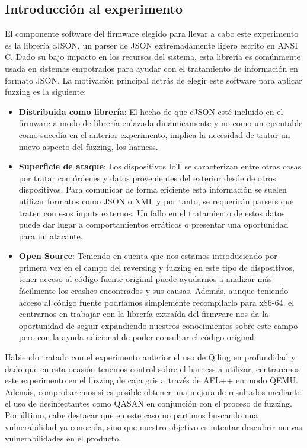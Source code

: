\subsection{Introducción al experimento}
El componente software del firmware elegido para llevar a cabo este experimento es la librería cJSON\cite{cJSON}, un parser de JSON extremadamente 
ligero escrito en ANSI C. Dado su bajo impacto en los recursos del sistema, esta librería es comúnmente usada en sistemas empotrados para
ayudar con el tratamiento de información en formato JSON. La motivación principal detrás de elegir este software para aplicar fuzzing es
la siguiente:
\begin{itemize}
    \item \textbf{Distribuida como librería}: El hecho de que cJSON esté incluido en el firmware a modo de librería enlazada dinámicamente y no como un ejecutable
    como sucedía en el anterior experimento, implica la necesidad de tratar un nuevo aspecto del fuzzing, los harness.
    \item \textbf{Superficie de ataque}: Los dispositivos IoT se caracterizan entre otras cosas por tratar con órdenes y datos provenientes del exterior
    desde de otros dispositivos. Para comunicar de forma eficiente esta información se suelen utilizar formatos como JSON o XML y por tanto, se 
    requerirán parsers que traten con esos inputs externos. Un fallo en el tratamiento de estos datos puede dar lugar a comportamientos erráticos o 
    presentar una oportunidad para un atacante.
    \item \textbf{Open Source}: Teniendo en cuenta que nos estamos introduciendo por primera vez en el campo del reversing y fuzzing en este tipo de 
    dispositivos, tener acceso al código fuente original puede ayudarnos a analizar más fácilmente los crashes encontrados y sus causas. Además, 
    aunque teniendo acceso al código fuente podríamos simplemente recompilarlo para x86-64, el centrarnos en trabajar con la librería extraída del firmware 
    nos da la oportunidad de seguir expandiendo nuestros conocimientos sobre este campo pero con la ayuda adicional de poder consultar el código original.
\end{itemize}

Habiendo tratado con el experimento anterior el uso de Qiling en profundidad y dado que en esta ocasión tenemos control sobre el harness a utilizar, centraremos
este experimento en el fuzzing de caja gris a través de AFL++ en modo QEMU. Además, comprobaremos si es posible obtener una mejora de resultados mediante 
el uso de desinfectantes como QASAN en conjunción con el proceso de fuzzing. Por último, cabe destacar que en este caso no partimos buscando una vulnerabilidad
ya conocida, sino que nuestro objetivo es intentar descubrir nuevas vulnerabilidades en el producto.

